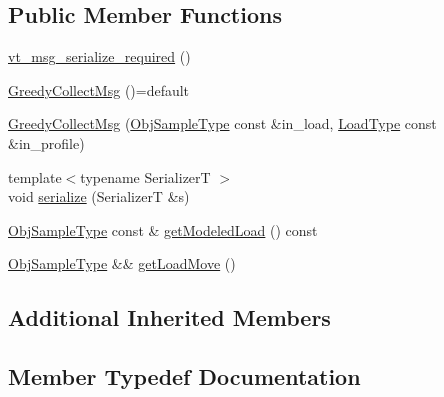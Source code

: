 \subsection*{Public Member Functions}
\begin{DoxyCompactItemize}
\item 
\hyperlink{structvt_1_1vrt_1_1collection_1_1lb_1_1_greedy_collect_msg_adf48bdb5542440ad7f1c958976f775da}{vt\+\_\+msg\+\_\+serialize\+\_\+required} ()
\item 
\hyperlink{structvt_1_1vrt_1_1collection_1_1lb_1_1_greedy_collect_msg_aed72919af1ca749e8502d892f8da495c}{Greedy\+Collect\+Msg} ()=default
\item 
\hyperlink{structvt_1_1vrt_1_1collection_1_1lb_1_1_greedy_collect_msg_ae619491c14d7adf736c32f14e90fdee1}{Greedy\+Collect\+Msg} (\hyperlink{structvt_1_1vrt_1_1collection_1_1lb_1_1_greedy_l_b_types_a467f8a79d0785fca5fc95bd5c0f406b9}{Obj\+Sample\+Type} const \&in\+\_\+load, \hyperlink{structvt_1_1vrt_1_1collection_1_1lb_1_1_greedy_l_b_types_a9fe8829bc0c92e88ddf9d149233a54f4}{Load\+Type} const \&in\+\_\+profile)
\item 
{\footnotesize template$<$typename SerializerT $>$ }\\void \hyperlink{structvt_1_1vrt_1_1collection_1_1lb_1_1_greedy_collect_msg_ac0f5ca855ef36a56595e6ab019cf9487}{serialize} (SerializerT \&s)
\item 
\hyperlink{structvt_1_1vrt_1_1collection_1_1lb_1_1_greedy_l_b_types_a467f8a79d0785fca5fc95bd5c0f406b9}{Obj\+Sample\+Type} const  \& \hyperlink{structvt_1_1vrt_1_1collection_1_1lb_1_1_greedy_collect_msg_a58eb8dc775f4259076fd9df4df8b496e}{get\+Modeled\+Load} () const
\item 
\hyperlink{structvt_1_1vrt_1_1collection_1_1lb_1_1_greedy_l_b_types_a467f8a79d0785fca5fc95bd5c0f406b9}{Obj\+Sample\+Type} \&\& \hyperlink{structvt_1_1vrt_1_1collection_1_1lb_1_1_greedy_collect_msg_a83ba5b561927582a06451672f95999a4}{get\+Load\+Move} ()
\end{DoxyCompactItemize}
\subsection*{Additional Inherited Members}


\subsection{Member Typedef Documentation}
\mbox{\label{structvt_1_1vrt_1_1collection_1_1lb_1_1_greedy_collect_msg_a6e6be2a54d20566764aec3bb66d93c1e}} 
